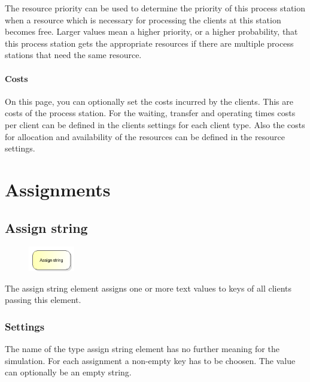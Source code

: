 The resource priority can be used to determine the priority of this process station when a resource
which is necessary for processing the clients at this station becomes free. Larger values mean a
higher priority, or a higher probability, that this process station gets the appropriate resources
if there are multiple process stations that need the same resource.

\subsubsection*{Costs}

On this page, you can optionally set the costs incurred by the clients. This are costs of the process station.
For the waiting, transfer and operating times costs per client can be defined in the clients settings for each
client type. Also the costs for allocation and availability of the resources can be defined in the resource settings.





\chapter{Assignments}

\section{Assign string}
\label{ref:ModelElementAssignString}

\begin{figure}
\vspace{-22pt}
\includegraphics[width=2cm]{imageModelElementAssignString.png}
\vspace{-22pt}
\end{figure}

The assign string element assigns one or more text values to keys of all clients passing this element.

\subsection*{Settings}

The name of the type assign string element has no further meaning for the simulation.
For each assignment a non-empty key has to be choosen. The value can optionally be an empty string.


